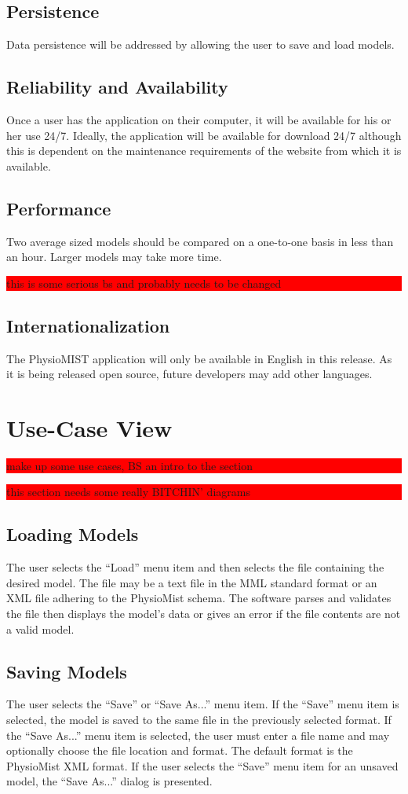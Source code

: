 \documentclass{article}
\newcommand{\todo}[1]{\colorbox{red}{\begin{minipage}{\textwidth}{#1}\end{minipage}}}
\begin{document}
\subsection{Persistence}
Data persistence will be addressed by allowing the user to save and load models.
\subsection{Reliability and Availability}
Once a user has the application on their computer, it will be available for his or her use 24/7.
Ideally, the application will be available for download 24/7 although this is dependent on the maintenance requirements of the website from which it is available.
\subsection{Performance}
Two average sized models should be compared on a one-to-one basis in less than an hour.  Larger models may take more time.
\todo{this is some serious bs and probably needs to be changed}
\subsection{Internationalization}
The PhysioMIST application will only be available in English in this release.
As it is being released open source, future developers may add other languages.

\section{Use-Case View}
\todo{make up some use cases, BS an intro to the section}
\todo{this section needs some really BITCHIN' diagrams}
\subsection{Loading Models}
The user selects the ``Load'' menu item and then selects the file containing the desired model. The file may be a text file in the MML standard format or an XML file adhering to the PhysioMist schema. The software parses and validates the file then displays the model's data or gives an error if the file contents are not a valid model.
\subsection{Saving Models}
The user selects the ``Save'' or ``Save As...'' menu item. If the ``Save'' menu item is selected, the model is saved to the same file in the previously selected format. If the ``Save As...'' menu item is selected, the user must enter a file name and may optionally choose the file location and format. The default format is the PhysioMist XML format. If the user selects the ``Save'' menu item for an unsaved model, the ``Save As...'' dialog is presented.
\end{document}
